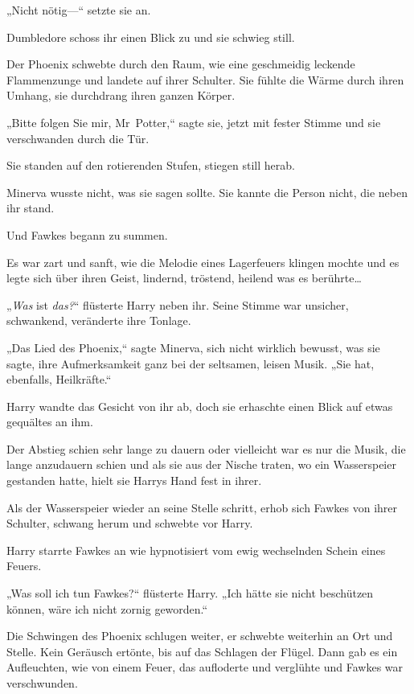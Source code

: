 {„Nicht nötig—“ setzte sie an.

Dumbledore schoss ihr einen Blick zu und sie schwieg still.

Der Phoenix schwebte durch den Raum, wie eine geschmeidig leckende Flammenzunge und landete auf ihrer Schulter. Sie fühlte die Wärme durch ihren Umhang, sie durchdrang ihren ganzen Körper.

„Bitte folgen Sie mir, Mr~Potter,“ sagte sie, jetzt mit fester Stimme und sie verschwanden durch die Tür.

\later

Sie standen auf den rotierenden Stufen, stiegen still herab.

Minerva wusste nicht, was sie sagen sollte. Sie kannte die Person nicht, die neben ihr stand.

Und Fawkes begann zu summen.

Es war zart und sanft, wie die Melodie eines Lagerfeuers klingen mochte und es legte sich über ihren Geist, lindernd, tröstend, heilend was es berührte…

„\emph{Was} ist \emph{das?}“ flüsterte Harry neben ihr. Seine Stimme war unsicher, schwankend, veränderte ihre Tonlage.

„Das Lied des Phoenix,“ sagte Minerva, sich nicht wirklich bewusst, was sie sagte, ihre Aufmerksamkeit ganz bei der seltsamen, leisen Musik. „Sie hat, ebenfalls, Heilkräfte.“

Harry wandte das Gesicht von ihr ab, doch sie erhaschte einen Blick auf etwas gequältes an ihm.

Der Abstieg schien sehr lange zu dauern oder vielleicht war es nur die Musik, die lange anzudauern schien und als sie aus der Nische traten, wo ein Wasserspeier gestanden hatte, hielt sie Harrys Hand fest in ihrer.

Als der Wasserspeier wieder an seine Stelle schritt, erhob sich Fawkes von ihrer Schulter, schwang herum und schwebte vor Harry.

Harry starrte Fawkes an wie hypnotisiert vom ewig wechselnden Schein eines Feuers.

„Was soll ich tun Fawkes?“ flüsterte Harry. „Ich hätte sie nicht beschützen können, wäre ich nicht zornig geworden.“

Die Schwingen des Phoenix schlugen weiter, er schwebte weiterhin an Ort und Stelle. Kein Geräusch ertönte, bis auf das Schlagen der Flügel. Dann gab es ein Aufleuchten, wie von einem Feuer, das aufloderte und verglühte und Fawkes war verschwunden.

}
